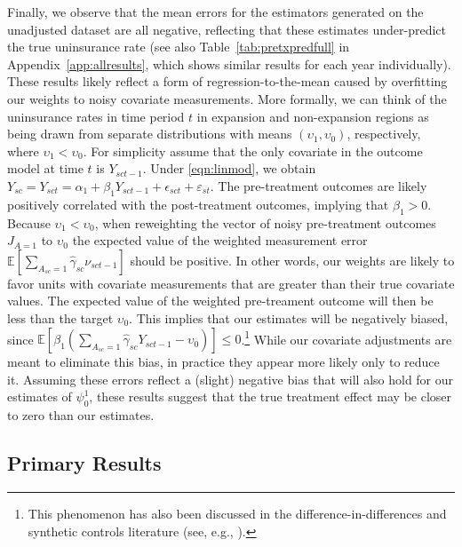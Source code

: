 \documentclass[aoas]{imsart}
\theoremstyle{plain}
\theoremstyle{remark}
\begin{document}
Finally, we observe that the mean errors for the estimators generated on the unadjusted dataset are all negative, reflecting that these estimates under-predict the true uninsurance rate (see also Table~\ref{tab:pretxpredfull} in Appendix~\ref{app:allresults}, which shows similar results for each year individually). These results likely reflect a form of regression-to-the-mean caused by overfitting our weights to noisy covariate measurements. More formally, we can think of the uninsurance rates in time period $t$ in expansion and non-expansion regions as being drawn from separate distributions with means $(\upsilon_1, \upsilon_0)$, respectively, where $\upsilon_1 < \upsilon_0$. For simplicity assume that the only covariate in the outcome model at time $t$ is $Y_{sct-1}$. Under \eqref{eqn:linmod}, we obtain $Y_{sc} = Y_{sct} = \alpha_1 + \beta_1Y_{sct-1} + \epsilon_{sct} + \varepsilon_{st}$. The pre-treatment outcomes are likely positively correlated with the post-treatment outcomes, implying that $\beta_1 > 0$. Because $\upsilon_1 < \upsilon_0$, when reweighting the vector of noisy pre-treatment outcomes $J_{A=1}$ to $\upsilon_0$ the expected value of the weighted measurement error $\mathbb{E}[\sum_{A_{sc} = 1}\hat{\gamma}_{sc}\nu_{sct-1}]$ should be positive. In other words, our weights are likely to favor units with covariate measurements that are greater than their true covariate values. The expected value of the weighted pre-treament outcome will then be less than the target $\upsilon_0$. This implies that our estimates will be negatively biased, since $\mathbb{E}[\beta_1(\sum_{A_{sc} = 1}\hat{\gamma}_{sc}Y_{sct-1} - \upsilon_0)] \le 0$.\footnote{This phenomenon has also been discussed in the difference-in-differences and synthetic controls literature (see, e.g., \cite{daw2018matching}).} While our covariate adjustments are meant to eliminate this bias, in practice they appear more likely only to reduce it. Assuming these errors reflect a (slight) negative bias that will also hold for our estimates of $\psi^1_0$, these results suggest that the true treatment effect may be closer to zero than our estimates. 

\subsection{Primary Results}
\end{document}
